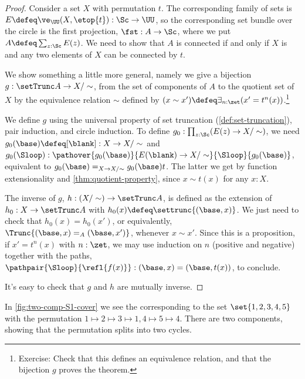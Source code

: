 \begin{proof}
  Consider a set $X$ with permutation $t$.
  The corresponding family of sets is $E\defeq\ve_\UU(X,\etop{t}) : \Sc\to\UU$,
  so the corresponding set bundle over the circle
  is the first projection, $\fst : A \to \Sc$,
  where we put $A\defeq\sum_{z:\Sc}E(z)$.
  We need to show that $A$ is connected if and only if $X$ is \nonempty
  and any two elements of $X$ can be connected by $t$.

  We show something a little more general, namely we give a bijection
  $g : \setTrunc A \to X/\sim$, from the set of components of $A$
  to the quotient set of $X$ by the equivalence relation $\sim$
  defined by $(x\sim x') \defeq \exists_{n:\zet}(x'=t^n(x))$.\footnote{%
    Exercise: Check that this defines an equivalence relation,
    and that the bijection $g$ proves the theorem.}

  We define $g$ using the universal property of set truncation (\cref{def:set-truncation}), pair induction, and circle induction.
  To define $g_0 : \prod_{z:\Sc}(E(z) \to X/\sim)$, we need
  $g_0(\base)\defeq[\blank] : X \to X/\sim$ and
  $g_0(\Sloop) : \pathover{g_0(\base)}{E(\blank) \to X/\sim}{\Sloop}{g_0(\base)}$,
  equivalent to $g_0(\base) =_{X \to X/\sim} g_0(\base)t$.
  The latter we get by function extensionality and \cref{thm:quotient-property},
  since $x \sim t(x)$ for any $x:X$.

  The inverse of $g$, $h:(X/\sim) \to \setTrunc A$,
  is defined as the extension of $h_0 : X \to \setTrunc A$
  with $h_0(x) \defeq \settrunc{(\base,x)}$.
  We just need to check that $h_0(x) = h_0(x')$, or equivalently,
  $\Trunc{(\base,x)=_A(\base,x')}$, whenever $x\sim x'$.
  Since this is a proposition, if $x'=t^n(x)$ with $n:\zet$,
  we may use induction on $n$ (positive and negative)
  together with the paths,
  $\pathpair{\Sloop}{\refl{f(x)}} : (\base,x)=(\base,t(x))$,
  to conclude.

  It's easy to check that $g$ and $h$ are mutually inverse.
\end{proof}
In \cref{fig:two-comp-S1-cover} we see the \covering corresponding
to the set $\set{1,2,3,4,5}$ with the permutation $1\mapsto 2\mapsto 3\mapsto 1,4\mapsto 5\mapsto 4$. There are two components, showing that the permutation splits into two cycles.
